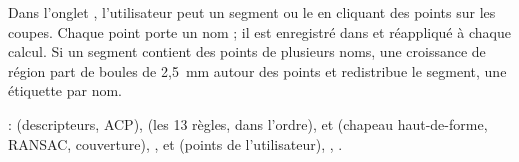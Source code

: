 Dans l'onglet , l'utilisateur peut  un segment ou le  en cliquant des
points sur les coupes. Chaque point porte un nom ; il est enregistré dans  et
réappliqué à chaque calcul. Si un segment contient des points de plusieurs noms, une croissance de région part de
boules de 2,5~mm autour des points et redistribue le segment, une étiquette par nom.

\begin{danslecode}
 :  (descripteurs, ACP),  (les
13 règles, dans l'ordre),  et  (chapeau haut-de-forme, RANSAC, couverture),
,  et  (points de l'utilisateur),
, .
\end{danslecode}
